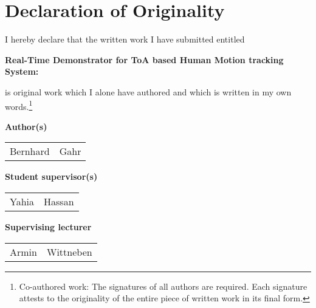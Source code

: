 
\section*{Declaration of Originality}

\vspace{1cm}

I hereby declare that the written work I have submitted entitled

\vspace{0.5cm}

\textbf{Real-Time Demonstrator for ToA based Human Motion tracking System: }

\vspace{0.5cm}

is original work which I alone have authored and which is written in my own words.\footnote{Co-authored work: The signatures of all authors are required. Each signature attests to the originality of the entire piece of written work in its final form.}

\vspace{1cm}

\textbf{Author(s)}

\vspace{0.5cm}

\begin{tabular}{ p{4cm} p{4cm} }
  Bernhard & Gahr \\
\end{tabular}

\vspace{0.5cm}

\textbf{Student supervisor(s)}

\vspace{0.5cm}

\begin{tabular}{ p{4cm} p{4cm} }
  Yahia & Hassan \\
\end{tabular}

\vspace{0.5cm}

\textbf{Supervising lecturer}

\vspace{0.5cm}

\begin{tabular}{ p{4cm} p{4cm} }
  Armin & Wittneben \\
\end{tabular}

